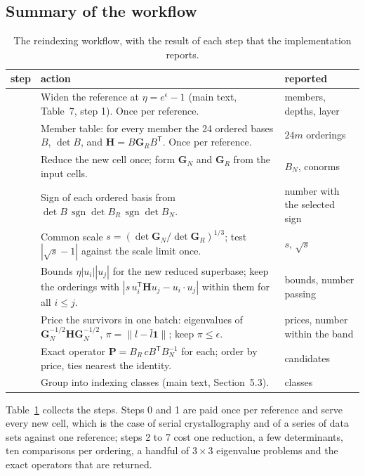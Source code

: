 \documentclass[preprint,pdf]{iucr}          %
\newcommand{\Gmet}{\mathbf{G}}
\newcommand{\Pop}{\mathbf{P}}
\begin{document}
\subsection{Summary of the workflow}

\begin{table}
\caption{The reindexing workflow, with the result of each step that the implementation reports.}
\label{tab:wf-steps}
\begin{footnotesize}
\begin{tabular}{>{\raggedright\arraybackslash}p{0.5cm}>{\raggedright\arraybackslash}p{7.6cm}>{\raggedright\arraybackslash}p{5.8cm}}
\toprule
step & action & reported \\
\midrule
0 & Widen the reference at $\eta=e^\epsilon-1$ (main text, Table~7, step 1). Once per reference. & members, depths, layer \\
1 & Member table: for every member the 24 ordered bases $B$, $\det B$, and $\mathbf H=B\Gmet_RB^{\mathsf T}$. Once per reference. & $24m$ orderings \\
2 & Reduce the new cell once; form $\Gmet_N$ and $\Gmet_R$ from the input cells. & $B_N$, conorms \\
3 & Sign of each ordered basis from $\det B\,\operatorname{sgn}\det B_R\,\operatorname{sgn}\det B_N$. & number with the selected sign \\
4 & Common scale $s=(\det\Gmet_N/\det\Gmet_R)^{1/3}$; test $|\sqrt s-1|$ against the scale limit once. & $s$, $\sqrt s$ \\
5 & Bounds $\eta|u_i||u_j|$ for the new reduced superbase; keep the orderings with $|s\,u_i^{\mathsf T}\mathbf Hu_j-u_i\cdot u_j|$ within them for all $i\le j$. & bounds, number passing \\
6 & Price the survivors in one batch: eigenvalues of $\Gmet_N^{-1/2}\mathbf H\Gmet_N^{-1/2}$, $\pi=\|l-\bar l\mathbf 1\|$; keep $\pi\le\epsilon$. & prices, number within the band \\
7 & Exact operator $\Pop=B_R\,cB^{\mathsf T}B_N^{-1}$ for each; order by price, ties nearest the identity. & candidates \\
8 & Group into indexing classes (main text, Section~5.3). & classes \\
\bottomrule
\end{tabular}
\end{footnotesize}
\end{table}

Table~\ref{tab:wf-steps} collects the steps. Steps 0 and 1 are paid once per reference and serve every new cell, which is the case of serial crystallography and of a series of data sets against one reference; steps 2 to 7 cost one reduction, a few determinants, ten comparisons per ordering, a handful of $3\times3$ eigenvalue problems and the exact operators that are returned.
\end{document}
